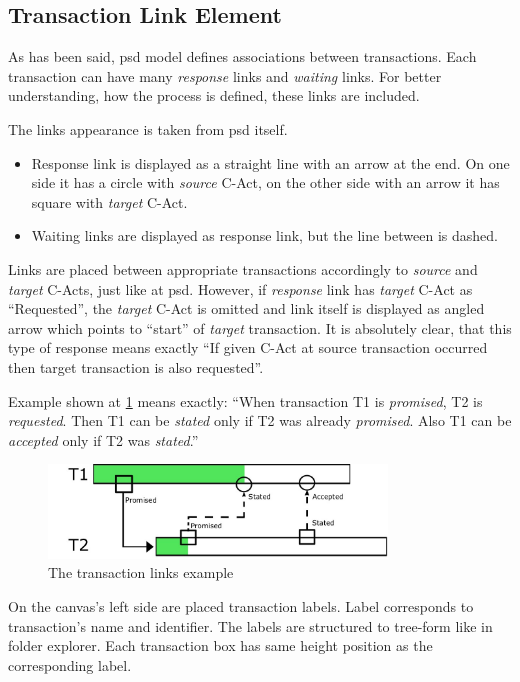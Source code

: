 \subsection{Transaction Link Element}
As has been said, \gls{psd} model defines associations between transactions. Each transaction can have many \textit{response} links and \textit{waiting} links. For better understanding, how the process is defined, these links are included. 

The links appearance is taken from \gls{psd} itself. 
\begin{itemize}
\item Response link is displayed as a straight line with an arrow at the end. On one side it has a circle with \textit{source} C-Act, on the other side with an arrow it has square with \textit{target} C-Act.
\item Waiting links are displayed as response link, but the line between is dashed. 
\end{itemize}

Links are placed between appropriate transactions accordingly to \textit{source} and \textit{target} C-Acts, just like at \gls{psd}. However, if \textit{response} link has \textit{target} C-Act as ``Requested'', the \textit{target} C-Act is omitted and link itself is displayed as angled arrow which points to ``start'' of \textit{target} transaction. It is absolutely clear, that this type of response means exactly ``If given C-Act at  source transaction occurred then target transaction is also requested''.

Example shown at \cref{fig:box-state-state} means exactly: ``When transaction T1 is \textit{promised}, T2 is \textit{requested}. Then T1 can be \textit{stated} only if T2 was already \textit{promised}. Also T1 can be \textit{accepted} only if T2 was \textit{stated}.''

\begin{figure}[ht!]
\centering
\includegraphics[width=9cm,keepaspectratio]{img/box-links-example}
\caption{The transaction links example}
\label{fig:box-state-state}
\end{figure}

On the canvas's left side are placed transaction labels. Label corresponds to transaction's name and identifier. The labels are structured to tree-form like in folder explorer. Each transaction box has same height position as the corresponding label. 


